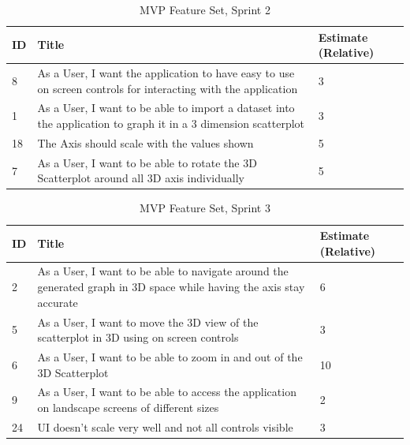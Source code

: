 \begin{table}[h]
    \begin{tabularx}{\textwidth}{ | X | X | X | }
        \hline
        ID & Title                                                                                                          & Estimate (Relative) \\
        \hline
        8  & As a User, I want the application to have easy to use on screen controls for interacting with the application  & 3                   \\
        \hline
        1  & As a User, I want to be able to import a dataset into the application to graph it in a 3 dimension scatterplot & 3                   \\
        \hline
        18 & The Axis should scale with the values shown                                                                    & 5                   \\
        \hline
        7  & As a User, I want to be able to rotate the 3D Scatterplot around all 3D axis individually                      & 5                   \\
        \hline
    \end{tabularx}
    \caption{MVP Feature Set, Sprint 2}
    \label{sprint2}
\end{table}

\begin{table}[h]
    \begin{tabularx}{\textwidth}{ | X | X | X | }
        \hline
        ID & Title                                                                                                               & Estimate (Relative) \\
        \hline
        2  & As a User, I want to be able to navigate around the generated graph in 3D space while having the axis stay accurate & 6                   \\
        \hline
        5  & As a User, I want to move the 3D view of the scatterplot in 3D using on screen controls                             & 3                   \\
        \hline
        6  & As a User, I want to be able to zoom in and out of the 3D Scatterplot                                               & 10                  \\
        \hline
        9  & As a User, I want to be able to access the application on landscape screens of different sizes                      & 2                   \\
        \hline
        24 & UI doesn't scale very well and not all controls visible                                                             & 3                   \\
        \hline
    \end{tabularx}
    \caption{MVP Feature Set, Sprint 3}
    \label{sprint3}
\end{table}


